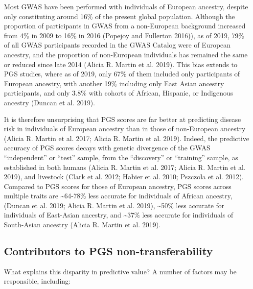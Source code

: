 \documentclass[
]{book}
\begin{document}
Most GWAS have been performed with individuals of European ancestry, despite only constituting around 16\% of the present global population. Although the proportion of participants in GWAS from a non-European background increased from 4\% in 2009 to 16\% in 2016 (Popejoy and Fullerton 2016)), as of 2019, 79\% of all GWAS participants recorded in the GWAS Catalog were of European ancestry, and the proportion of non-European individuals has remained the same or reduced since late 2014 (Alicia R. Martin et al. 2019). This bias extends to PGS studies, where as of 2019, only 67\% of them included only participants of European ancestry, with another 19\% including only East Asian ancestry participants, and only 3.8\% with cohorts of African, Hispanic, or Indigenous ancestry (Duncan et al. 2019).

It is therefore unsurprising that PGS scores are far better at predicting disease risk in individuals of European ancestry than in those of non-European ancestry (Alicia R. Martin et al. 2017; Alicia R. Martin et al. 2019). Indeed, the predictive accuracy of PGS scores decays with genetic divergence of the GWAS ``independent'' or ``test'' sample, from the ``discovery'' or ``training'' sample, as established in both humans (Alicia R. Martin et al. 2017; Alicia R. Martin et al. 2019), and livestock (Clark et al. 2012; Habier et al. 2010; Pszczola et al. 2012). Compared to PGS scores for those of European ancestry, PGS scores across multiple traits are \textasciitilde64-78\% less accurate for individuals of African ancestry, (Duncan et al. 2019; Alicia R. Martin et al. 2019), \textasciitilde50\% less accurate for individuals of East-Asian ancestry, and \textasciitilde37\% less accurate for individuals of South-Asian ancestry (Alicia R. Martin et al. 2019).

\hypertarget{contributors-to-pgs-non-transferability}{%
\subsection{Contributors to PGS non-transferability}\label{contributors-to-pgs-non-transferability}}

What explains this disparity in predictive value? A number of factors may be responsible, including:
\end{document}
